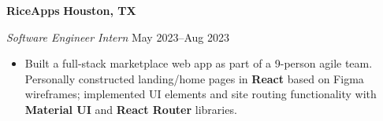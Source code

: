 \textbf{RiceApps} \hfill \textbf{Houston, TX}\par
\textit{Software Engineer Intern} \hfill May 2023--Aug 2023
\begin{itemize}
    \item Built a full-stack marketplace web app as part of a 9-person agile team. Personally constructed landing/home pages in \textbf{React} based on Figma wireframes; implemented UI elements and site routing functionality with \textbf{Material UI} and \textbf{React Router} libraries.
\end{itemize}\par

